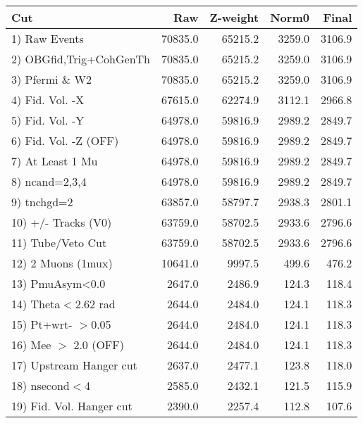  \begin{table}[h!]\centering
 \begin{tabular}{||l||r|r|r|r||}
 \hline
 \hline
 Cut & Raw & Z-weight & Norm0 & Final \\
 \hline
  1) Raw Events           &     70835.0 &     65215.2 &      3259.0 &      3106.9 \\
  2) OBGfid,Trig+CohGenTh &     70835.0 &     65215.2 &      3259.0 &      3106.9 \\
  3) Pfermi \& W2         &     70835.0 &     65215.2 &      3259.0 &      3106.9 \\
  4) Fid. Vol. -X         &     67615.0 &     62274.9 &      3112.1 &      2966.8 \\
  5) Fid. Vol. -Y         &     64978.0 &     59816.9 &      2989.2 &      2849.7 \\
  6) Fid. Vol. -Z (OFF)   &     64978.0 &     59816.9 &      2989.2 &      2849.7 \\
  7) At Least 1 Mu        &     64978.0 &     59816.9 &      2989.2 &      2849.7 \\
  8) ncand=2,3,4          &     64978.0 &     59816.9 &      2989.2 &      2849.7 \\
  9) tnchgd=2             &     63857.0 &     58797.7 &      2938.3 &      2801.1 \\
 10) +/- Tracks (V0)      &     63759.0 &     58702.5 &      2933.6 &      2796.6 \\
 11) Tube/Veto Cut        &     63759.0 &     58702.5 &      2933.6 &      2796.6 \\
 12) 2 Muons (1mux)       &     10641.0 &      9997.5 &       499.6 &       476.2 \\
 13) PmuAsym<0.0          &      2647.0 &      2486.9 &       124.3 &       118.4 \\
 14) Theta$<$2.62 rad     &      2644.0 &      2484.0 &       124.1 &       118.3 \\
 15) Pt+wrt- $>$0.05      &      2644.0 &      2484.0 &       124.1 &       118.3 \\
 16) Mee $>$ 2.0  (OFF)   &      2644.0 &      2484.0 &       124.1 &       118.3 \\
 17) Upstream Hanger cut  &      2637.0 &      2477.1 &       123.8 &       118.0 \\
 18) nsecond$<$4          &      2585.0 &      2432.1 &       121.5 &       115.9 \\
 19) Fid. Vol. Hanger cut &      2390.0 &      2257.4 &       112.8 &       107.6 \\

\end{tabular}
\end{table}
